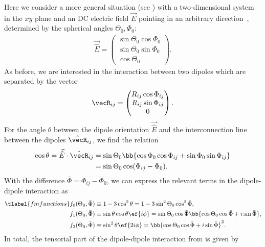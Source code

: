 \noindent
Here we consider a more general situation (see ) with a two-dimensional system in the $xy$ plane and an DC electric field $\vec{E}$ pointing in an arbitrary direction~\cite{Gorshkov2011c}, determined by the spherical angles $\Theta_0, \Phi_0$:
\begin{align}
    \vec{\hat{E}}=\begin{pmatrix}
        \sin\Theta_0\cos\Phi_0 \\
        \sin\Theta_0\sin\Phi_0 \\
        \cos\Theta_0
    \end{pmatrix}.
\end{align}
As before, we are interested in the interaction between two dipoles which are separated
by the vector
\begin{align}
\vecR_{ij} = \begin{pmatrix}R_{ij} \cos\Phi_{ij} \\ R_{ij} \sin\Phi_{ij} \\ 0\end{pmatrix}.
\end{align}
For the angle $\theta$ between the dipole orientation $\vec{\hat{E}}$ and the interconnection line between the dipoles $\hat{\vecR}_{ij}$, we find the relation
\begin{align}
    \cos\theta = \vec{\hat{E}} \cdot \hat{\vecR}_{ij} &= \sin\Theta_0\bb{\cos\Phi_0\cos\Phi_{ij}+\sin\Phi_0\sin\Phi_{ij}}\\
                                                      &=\sin\Theta_0\cos(\Phi_{ij}-\Phi_0).
\end{align}
With the difference $\bar\Phi=\Phi_{ij}-\Phi_0$, we can express the relevant terms in the dipole-dipole interaction as
\begin{align} \tlabel{fmfunctions}
    f_0(\Theta_0, \bar \Phi)&\equiv 1-3\cos^2\theta = 1-3\sin^2\Theta_0\cos^2\bar\Phi, \vphantom{\bb{\bar \Phi}} \\
    f_1(\Theta_0, \bar \Phi)&\equiv \sin\theta\cos\theta \ef{i\phi} = \sin\Theta_0 \cos\bar\Phi \bb{\cos\Theta_0 \cos\bar\Phi + i \sin \bar\Phi}, \\
    f_2(\Theta_0, \bar \Phi)&\equiv\sin^2\theta \ef{2i\phi} = \bb{\cos\Theta_0 \cos\bar\Phi + i \sin \bar\Phi}^2.
\end{align}
In total, the tensorial part of the dipole-dipole interaction from  is given by
